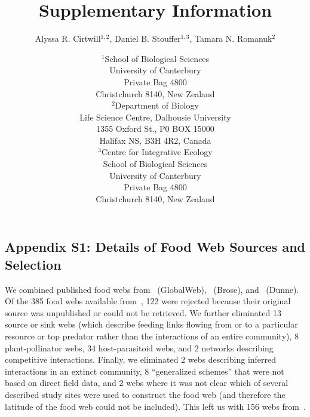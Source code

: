 \documentclass[12pt]{article}
\newcommand{\beginsupplement}{%
        \setcounter{table}{0}
        \renewcommand{\thetable}{S\arabic{table}}%
        \setcounter{figure}{0}
        \renewcommand{\thefigure}{S\arabic{figure}}%
     }
\begin{document}
\title{Supplementary Information}
\author{Alyssa R. Cirtwill$^{1,2}$, Daniel B. Stouffer$^{1,3}$, Tamara N. Romanuk$^{2}$}
\date{\small$^1$School of Biological Sciences\\University of Canterbury\\
Private Bag 4800\\Christchurch 8140, New Zealand \\
\medskip$^2$Department of Biology\\
Life Science Centre, Dalhousie University\\1355 Oxford St., P0 BOX 15000\\
Halifax NS, B3H 4R2, Canada\\
\medskip$^3$Centre for Integrative Ecology\\School of Biological Sciences\\University of Canterbury\\
Private Bag 4800\\Christchurch 8140, New Zealand \\}



\maketitle
\baselineskip=8.5mm

\vspace{0.4 in}
\beginsupplement
\subsection*{Appendix S1: Details of Food Web Sources and Selection}

  We combined published food webs from~\citet{GlobaWeb} (GlobalWeb),~\citet{Brose2006} (Brose), 
  and~\citet{Dunne2013} (Dunne).
  Of the 385 food webs available from~\citet{Globalweb}, 122 were rejected because their original
  source was unpublished or could not be retrieved. We further eliminated 13 source or sink webs
  (which describe feeding links flowing from or to a particular resource or top predator rather
  than the interactions of an entire community), 8 plant-pollinator webs, 34 host-parasitoid webs,
  and 2 networks describing competitive interactions. Finally, we eliminated 2 webs describing 
  inferred interactions in an extinct community, 8 ``generalized schemes'' that were not based
  on direct field data, and 2 webs where it was not clear which of several described study sites
  were used to construct the food web (and therefore the latitude of the food web could not be 
  included). This left us with 156 webs from~\citet{GlobalWeb}.
\end{document}
